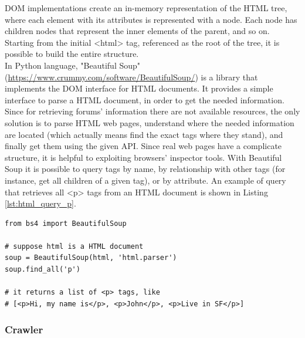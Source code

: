 DOM implementations create an in-memory representation of the HTML tree, where each element with its attributes is represented with a node. Each node has children nodes that represent the inner elements of the parent, and so on. Starting from the initial <html> tag, referenced as the root of the tree, it is possible to build the entire structure.\\

In Python language, "Beautiful Soup" (\url{https://www.crummy.com/software/BeautifulSoup/}) is a library that implements the DOM interface for HTML documents. It provides a simple interface to parse a HTML document, in order to get the needed information. Since for retrieving forums' information there are not available resources, the only solution is to parse HTML web pages, understand where the needed information are located (which actually means find the exact tags where they stand), and finally get them using the given API. Since real web pages have a complicate structure, it is helpful to exploiting browsers'  inspector tools. With Beautiful Soup it is possible to query tags by name, by relationship with other tags (for instance, get all children of a given tag), or by attribute. An example of query that retrieves all <p> tags from an HTML document is shown in Listing \ref{lst:html_query_p}.

\lstset{language=Python}
\lstset{frame=lines}
\lstset{basicstyle=\footnotesize}
\begin{lstlisting}
from bs4 import BeautifulSoup

# suppose html is a HTML document
soup = BeautifulSoup(html, 'html.parser')
soup.find_all('p')

# it returns a list of <p> tags, like
# [<p>Hi, my name is</p>, <p>John</p>, <p>Live in SF</p>]
\end{lstlisting}



\subsubsection{Crawler}

